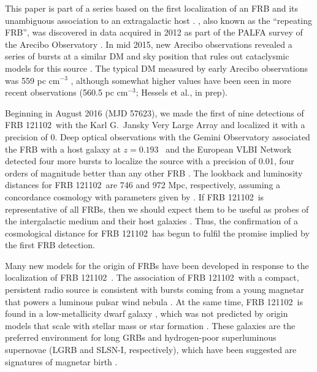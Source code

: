 \documentclass[twocolumn]{aastex61}
\newcommand{\frb}{FRB 121102}
\begin{document}
This paper is part of a series based on the first localization of an FRB and its unambiguous association to an extragalactic host \citep{LOC, OPT, EVN}. , also known as the ``repeating FRB'', was discovered \citep{2014ApJ...790..101S} in data acquired in 2012 as part of the PALFA survey of the Arecibo Observatory \citep{2006ApJ...637..446C, 2015ApJ...812...81L}. In mid 2015, new Arecibo observations revealed a series of bursts at a similar DM and sky position that rules out cataclysmic models for this source \citep{2016Natur.531..202S}. The typical DM measured by early Arecibo observations was 559 pc cm$^{-3}$ \citep{2016arXiv160308880S}, although somewhat higher values have been seen in more recent observations (560.5 pc cm$^{-3}$; Hessels et al., in prep).

Beginning in August 2016 (MJD 57623), we made the first of nine detections of \frb\ with the Karl G.\ Jansky Very Large Array \citep[VLA;][]{LOC} and localized it with a precision of 0. Deep optical observations with the Gemini Observatory associated the FRB with a host galaxy at $z=0.193$\ \citep{OPT} and the European VLBI Network detected four more bursts to localize the source with a precision of 0.01\arcsec, four orders of magnitude better than any other FRB \citep[precision of $\sim40$\ pc in linear distance;][]{EVN}. The lookback and luminosity distances for \frb\ are 746 and 972 Mpc, respectively, assuming a concordance cosmology with parameters given by \citet{2016A&A...594A..13P}. If \frb\ is representative of all FRBs, then we should expect them to be useful as probes of the intergalactic medium and their host galaxies \citep{2015MNRAS.451.3278M}. Thus, the confirmation of a cosmological distance for \frb\ has begun to fulfil the promise implied by the first FRB detection.

Many new models for the origin of FRBs have been developed in response to the localization of \frb\ \citep{2017arXiv170104815K, 2017arXiv170102370M, 2017arXiv170104094Z, 2017arXiv170102492D, 2017arXiv170208644B, 2017arXiv170300393T}. The association of \frb\ with a compact, persistent radio source is consistent with bursts coming from a young magnetar that powers a luminous pulsar wind nebula \citep{2017arXiv170104815K}. At the same time, \frb\ is found in a low-metallicity dwarf galaxy \citep{OPT}, which was not predicted by origin models that scale with stellar mass or star formation \citep{2017arXiv170400022N}. These galaxies are the preferred environment for long GRBs and hydrogen-poor superluminous supernovae (LGRB and SLSN-I, respectively), which have been suggested are signatures of magnetar birth \citep{2008AJ....135.1136M, 2014ApJ...787..138L}.
\end{document}
